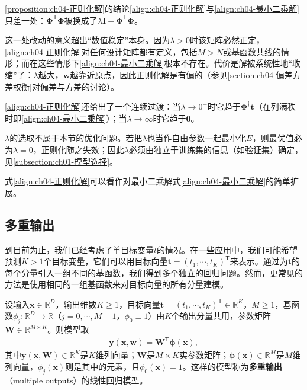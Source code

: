 \documentclass[../../main.tex]{subfiles}
\begin{document}
\begin{remark}
\cref{proposition:ch04-正则化解}的结论\eqref{align:ch04-正则化解}与\eqref{align:ch04-最小二乘解}只差一处：$\boldsymbol{\Phi}^{\mathsf{T}}\boldsymbol{\Phi}$被换成了$\lambda\boldsymbol{I}+\boldsymbol{\Phi}^{\mathsf{T}}\boldsymbol{\Phi}$。

这一处改动的意义超出“数值稳定”本身。因为$\lambda>0$时该矩阵必然正定，\eqref{align:ch04-正则化解}对任何设计矩阵都有定义，包括$M>N$或基函数共线的情形；而在这些情形下\eqref{align:ch04-最小二乘解}根本不存在。代价是解被系统性地“收缩”了：$\lambda$越大，$\boldsymbol{w}$越靠近原点，因此正则化解是有偏的（参见\cref{section:ch04-偏差方差权衡}对偏差与方差的讨论）。

\eqref{align:ch04-正则化解}还给出了一个连续过渡：当$\lambda\to0^{+}$时它趋于$\boldsymbol{\Phi}^{\dagger}\boldsymbol{t}$（在列满秩时即\eqref{align:ch04-最小二乘解}）；当$\lambda\to\infty$时它趋于$\boldsymbol{0}$。

$\lambda$的选取不属于本节的优化问题。若把$\lambda$也当作自由参数一起最小化$E$，则最优值必为$\lambda=0$，正则化随之失效；因此$\lambda$必须由独立于训练集的信息（如验证集）确定，见\cref{subsection:ch01-模型选择}。
\end{remark}

式\eqref{align:ch04-正则化解}可以看作对最小二乘解式\eqref{align:ch04-最小二乘解}的简单扩展。

\subsection{多重输出}\label{subsection:ch04-多重输出}

到目前为止，我们已经考虑了单目标变量$t$的情况。在一些应用中，我们可能希望预测$K>1$个目标变量，它们可以用目标向量$\boldsymbol{t}=(t_1,\cdots,t_K)^{\mathsf{T}}$来表示。通过为$\boldsymbol{t}$的每个分量引入一组不同的基函数，我们得到多个独立的回归问题。然而，更常见的方法是使用相同的一组基函数来对目标向量的所有分量建模。

\begin{definition}[多重输出回归]\label{definition:ch04-多重输出}
设输入$\boldsymbol{x}\in\mathbb{R}^{D}$，输出维数$K\geqslant1$，目标向量$\boldsymbol{t}=(t_1,\cdots,t_K)^{\mathsf{T}}\in\mathbb{R}^{K}$，$M\geqslant1$，基函数$\phi_j:\mathbb{R}^{D}\to\mathbb{R}$（$j=0,\cdots,M-1$，$\phi_0\equiv1$）由$K$个输出分量共用，参数矩阵$\boldsymbol{W}\in\mathbb{R}^{M\times K}$。则模型取
\begin{align}
  \boldsymbol{y}(\boldsymbol{x},\boldsymbol{w})=\boldsymbol{W}^{\mathsf{T}}\boldsymbol{\phi}(\boldsymbol{x}),
  \label{align:ch04-多重输出}
\end{align}
其中$\boldsymbol{y}(\boldsymbol{x},\boldsymbol{W})\in\mathbb{R}^{K}$是$K$维列向量；$\boldsymbol{W}$是$M\times K$实参数矩阵；$\boldsymbol{\phi}(\boldsymbol{x})\in\mathbb{R}^{M}$是$M$维列向量，$\phi_j(\boldsymbol{x})$则是其中的元素，且$\phi_0(\boldsymbol{x})=1$。这样的模型称为\textbf{多重输出}（multiple outputs）的线性回归模型。
\end{definition}
\end{document}
